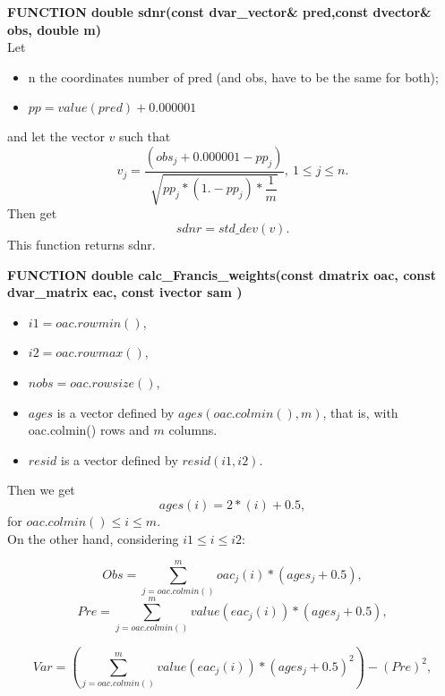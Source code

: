 \documentclass{article}
\begin{document}
\textbf{FUNCTION double sdnr(const dvar\_vector\& pred,const dvector\& obs, double m)}\\
Let
\begin{itemize}
    \item n the coordinates number of pred (and obs, have to be the same for both);
    \item $pp = value(pred)+0.000001$
\end{itemize}
and let the vector $v$ such that
\begin{equation}
    v_j=\dfrac{(obs_j+0.000001-pp_j)}{\sqrt{pp_j*(1.-pp_j)*\dfrac{1}{m}}}, \ 1\leq j \leq n.
\end{equation}
Then get
\begin{equation}
    sdnr = std\_dev\left(v\right).
\end{equation}
This function returns sdnr.



\textbf{FUNCTION double calc\_Francis\_weights(const dmatrix oac, const dvar\_matrix eac, const ivector sam )}\\
\begin{itemize}
    \item $i1=oac.rowmin()$,
    \item $i2=oac.rowmax()$,
    \item $nobs = oac.rowsize()$,
    \item $ages$ is a vector defined by $ages(oac.colmin(),m)$, that is, with oac.colmin() rows and $m$ columns.
    \item $resid$ is a vector defined by $resid(i1,i2)$.
\end{itemize}
Then we get
\begin{equation}
    ages(i) = 2*(i) + 0.5,
\end{equation}
for  $oac.colmin() \leq i \leq m$.\\

On the other hand, considering $i1\leq i \leq i2$:

\begin{equation}
    Obs = \sum_{j=oac.colmin()}^{m}oac_j(i) * (ages_j+0.5),
\end{equation}
\begin{equation}
    Pre = \sum_{j=oac.colmin()}^m value(eac_j(i)) * (ages_j+ 0.5),
\end{equation}

\begin{equation}
    Var = \left(\sum_{j=oac.colmin()}^mvalue(eac_j(i)) * (ages_j+0.5)^2\right) - (Pre)^2,
\end{equation}
\end{document}
